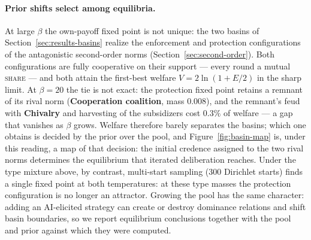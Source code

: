 \paragraph{Prior shifts select among equilibria.}
At large $\beta$ the own-payoff fixed point is not unique: the two
basins of Section~\ref{sec:results-basins} realize the enforcement
and protection configurations of the antagonistic second-order norms
(Section~\ref{sec:second-order}).
Both configurations are fully cooperative on their support --- every
round a mutual \textup{\textsc{share}} --- and both attain the
first-best welfare $V = 2\ln(1 + E/2)$ in the sharp limit.
At $\beta = 20$ the tie is not exact: the protection fixed point
retains a remnant of its rival norm (\textbf{Cooperation coalition},
mass $0.008$), and the remnant's feud with \textbf{Chivalry} and
harvesting of the subsidizers cost $0.3\%$ of welfare --- a gap that
vanishes as $\beta$ grows.
Welfare therefore barely separates the basins; which one obtains is
decided by the prior over the pool, and Figure~\ref{fig:basin-map}
is, under this reading, a map of that decision: the initial credence
assigned to the two rival norms determines the equilibrium that
iterated deliberation reaches.
Under the type mixture above, by contrast, multi-start sampling
($300$ Dirichlet starts) finds a single fixed point at both
temperatures: at these type masses the protection configuration is no
longer an attractor.
Growing the pool has the same character: adding an AI-elicited
strategy can create or destroy dominance relations and shift basin
boundaries, so we report equilibrium conclusions together with the
pool and prior against which they were computed.
